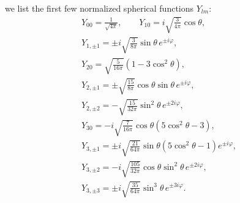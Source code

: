 we list the first few normalized spherical functions $Y_{lm}$:
\begin{gather*}
 Y_{00}=\frac1{\sqrt{4\pi}},\hspace{2em}
 Y_{10}=i\sqrt{\frac3{4\pi}}\cos\theta,\\
 Y_{1,\pm1}=\pm i\sqrt{\frac3{8\pi}}\sin\theta\,e^{\pm i\varphi},\\
 Y_{20}=\sqrt{\frac5{16\pi}}(1-3\cos^2\theta),\\
 Y_{2,\pm1}=\pm\sqrt{\frac{15}{8\pi}}
 \cos\theta\sin\theta\,e^{\pm i\varphi},\\
 Y_{2,\pm2}=-\sqrt{\frac{15}{32\pi}}\sin^2\theta\,e^{\pm2i\varphi},\\
 Y_{30}=-i\sqrt{\frac7{16\pi}}\cos\theta(5\cos^2\theta-3),\\
 Y_{3,\pm1}=\pm i\sqrt{\frac{21}{64\pi}}
 \sin\theta(5\cos^2\theta-1)e^{\pm i\varphi},\\
 Y_{3,\pm2}=-i\sqrt{\frac{105}{32\pi}}
 \cos\theta\sin^2\theta\,e^{\pm2i\varphi},\\
 Y_{3,\pm3}=\pm i\sqrt{\frac{35}{64\pi}}
 \sin^3\theta\,e^{\pm3i\varphi}.
\end{gather*}
